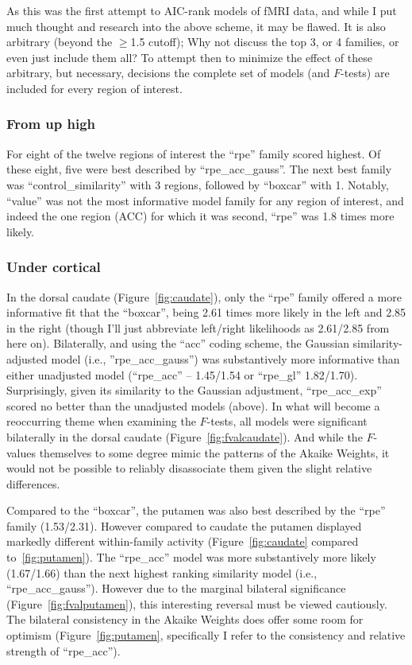 As this was the first attempt to AIC-rank models of fMRI data, and while I put much thought and research into the above scheme, it may be flawed.  It is also arbitrary (beyond the $\ge$1.5 cutoff); Why not discuss the top 3, or 4 families, or even just include them all?  To attempt then to minimize the effect of these arbitrary, but necessary, decisions the complete set of models (and $F$-tests) are included for every region of interest.


\subsubsection{From up high}
\label{subsub:fromuphigh}
For eight of the twelve regions of interest the ``rpe'' family scored highest.  Of these eight, five were best described by ``rpe\_acc\_gauss''.  The next best family was ``control\_similarity'' with 3 regions, followed by ``boxcar'' with 1.  Notably, ``value'' was not the most informative model family for any region of interest, and indeed the one region (ACC) for which it was second, ``rpe'' was 1.8 times more likely.


\subsubsection{Under cortical}
\label{subsub:belowctx}
In the dorsal caudate (Figure~\ref{fig:caudate}), only the ``rpe'' family offered a more informative fit that the ``boxcar'', being 2.61 times more likely in the left and 2.85 in the right (though I'll just abbreviate left/right likelihoods as 2.61/2.85 from here on).  Bilaterally, and using the ``acc'' coding scheme, the Gaussian similarity-adjusted model (i.e., ''rpe\_acc\_gauss'') was substantively more informative than either unadjusted model (``rpe\_acc'' -- 1.45/1.54 or ``rpe\_gl'' 1.82/1.70).  Surprisingly, given its similarity to the Gaussian adjustment, ``rpe\_acc\_exp'' scored no better than the unadjusted models (above).  In what will become a reoccurring theme when examining the $F$-tests, all models were significant bilaterally in the dorsal caudate (Figure~\ref{fig:fvalcaudate}).  And while the $F$-values themselves to some degree mimic the patterns of the Akaike Weights, it would not be possible to reliably disassociate them given the slight relative differences.  

Compared to the ``boxcar'', the putamen was also best described by the ``rpe'' family (1.53/2.31).  However compared to caudate the putamen displayed markedly different within-family activity (Figure~\ref{fig:caudate} compared to~\ref{fig:putamen}). The ``rpe\_acc'' model was more substantively more likely (1.67/1.66) than the next highest ranking similarity model (i.e., ``rpe\_acc\_gauss'').  However due to the marginal bilateral significance (Figure~\ref{fig:fvalputamen}), this interesting reversal must be viewed cautiously.  The bilateral consistency in the Akaike Weights does offer some room for optimism (Figure~\ref{fig:putamen}, specifically I refer to the consistency and relative strength of ``rpe\_acc'').


